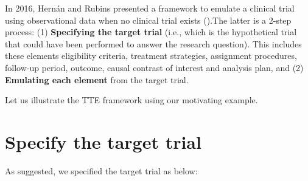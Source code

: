 \documentclass[
]{book}
\begin{document}
In 2016, Hernán and Rubins presented a framework to emulate a clinical
trial using observational data when no clinical trial exists
().The latter is
a 2-step process: (1) \textbf{Specifying the target trial} (i.e., which
is the hypothetical trial that could have been performed to answer the
research question). This includes these elements eligibility criteria,
treatment strategies, assignment procedures, follow-up period, outcome,
causal contrast of interest and analysis plan, and (2) \textbf{Emulating
each element} from the target trial.

Let us illustrate the TTE framework using our motivating example.

\section{Specify the target trial}\label{specify-the-target-trial}

As suggested, we specified the target trial as below:
\end{document}
